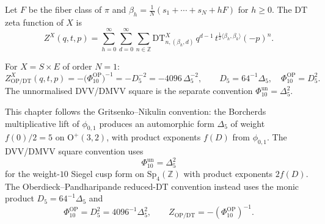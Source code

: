 \begin{definition}
\label{def:dt-zeta-k3e}
Let $F$ be the fiber class of $\pi$ and $\beta_h = \frac{1}{N}(s_1 + \cdots + s_N + hF)$ for $h \geq 0$. The DT zeta function of $X$ is
\[
 Z^X(q, t, p) = \sum_{h=0}^{\infty} \sum_{d=0}^{\infty} \sum_{n \in \mathbb{Z}} \mathrm{DT}^X_{n,(\beta_h, d)} \, q^{d-1} \, t^{\frac{1}{2}\langle \beta_h, \beta_k \rangle} (-p)^n.
\]
\end{definition}

\begin{theorem}
\label{thm:dt-igusa}
For $X = S \times E$ of order $N = 1$:
\[
 Z^X_{\mathrm{OP/DT}}(q, t, p)
 =-\bigl(\Phi_{10}^{\mathrm{OP}}\bigr)^{-1}
 =-D_5^{-2}
 =-4096\,\Delta_5^{-2},
 \qquad
 D_5=64^{-1}\Delta_5,\quad \Phi_{10}^{\mathrm{OP}}=D_5^2.
\]
The unnormalised DVV/DMVV square is the separate convention
\(\Phi_{10}^{\mathrm{un}}=\Delta_5^2\).
\end{theorem}

\begin{remark}
\label{rem:k3e-convention-delta5-phi10}
This chapter follows the Gritsenko--Nikulin convention: the Borcherds multiplicative lift of $\phi_{0,1}$ produces an automorphic form $\Delta_5$ of weight $f(0)/2 = 5$ on $\mathrm{O}^+(3,2)$, with product exponents $f(D)$ from $\phi_{0,1}$. The DVV/DMVV square convention uses
\[
 \Phi_{10}^{\mathrm{un}}=\Delta_5^2
\]
for the weight-$10$ Siegel cusp form on $\mathrm{Sp}_4(\mathbb{Z})$ with product exponents \(2f(D)\). The Oberdieck--Pandharipande reduced-DT convention instead uses the monic product \(D_5=64^{-1}\Delta_5\) and
\[
 \Phi_{10}^{\mathrm{OP}}=D_5^2=4096^{-1}\Delta_5^2,\qquad
 Z_{\mathrm{OP/DT}}=-(\Phi_{10}^{\mathrm{OP}})^{-1}.
\]
\end{remark}

